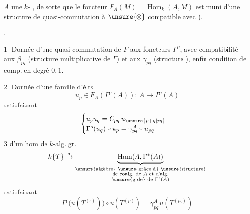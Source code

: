 




 $A$ une $k$- , de sorte que le foncteur $F_A(M)=\operatorname{Hom}_k(A,M)$
est muni d'une structure de quasi-commutation à $\unsure{\otimes}$ compatible avec ).

  .

\textcircled{1} Donnée d'une quasi-commutation de $F$ aux foncteurs $\Gamma^p$, avec compatibilité aux $\beta_{pq}$ (structure multiplicative de $\Gamma$) et aux $\gamma_{pq}$ (structure ), enfin  condition de comp. en degré $0,1$.

\textcircled{2} Donnée d'une famille d'élts
\[
u_p\in F_A(\Gamma^p(A)):\ A\longrightarrow\Gamma^p(A)
\]
satisfaisant
\[
\begin{cases}
u_pu_q=C_{pq}\,u_{\unsure{p+q|pq}}\\
\Gamma^p(u_q)\circ u_p=\gamma^A_{pq}\circ u_{pq}
\end{cases}
\]
3 d'un hom  de $k$-alg. gr. 
\[
k\{T\}\xrightarrow{u}
\underbrace{\operatorname{Hom}(A,\Gamma^*(A))}_{\substack{\unsure{\text{algèbre}}\ \unsure{\text{grâce à}}\ \unsure{\text{structure}}\\
\text{de coalg. de }A\text{ et d'alg.}\\
\unsure{\text{grde}}\text{ de }\Gamma^*(A)}}
\]
satisfaisant
\[
\Gamma^p\bigl(u(T^{(q)})\bigr)\circ u(T^{(p)})
=\gamma^A_{pq}\,u(T^{(pq)})
\]

